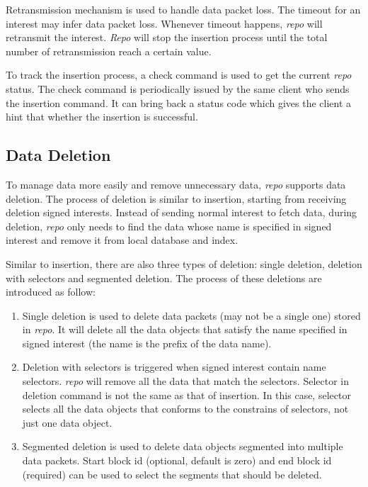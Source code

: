 \documentclass[conference]{IEEEtran}
\begin{document}
Retransmission mechanism is used to handle data packet loss. The timeout for an interest may infer data packet loss. Whenever timeout happens, \emph{repo} will retransmit the interest. \emph{Repo} will stop the insertion process until the total number of retransmission reach a certain value.

To track the insertion process, a check command is used to get the current \emph{repo} status. The check command is periodically issued by the same client who sends the insertion command. It can bring back a status code which gives the client a hint that whether the insertion is successful.

\subsection{Data Deletion}

To manage data more easily and remove unnecessary data, \emph{repo} supports data deletion. The process of deletion is similar to insertion, starting from receiving deletion signed interests. Instead of sending normal interest to fetch data, during deletion, \emph{repo} only needs to find the data whose name is specified in signed interest and remove it
from local database and index.

Similar to insertion, there are also three types of deletion: single deletion, deletion with selectors and segmented deletion. The process of these deletions are introduced as follow:

\begin{enumerate}
\item Single deletion is used to delete data packets (may not be a single one) stored in \emph{repo}. It will delete all the data objects that satisfy the name specified in signed interest (the name is the prefix of the data name).
\item Deletion with selectors is triggered when signed interest contain name selectors. \emph{repo} will remove all the data that match the selectors. Selector in deletion command is not the same as that of insertion. In this case, selector selects all the data objects that conforms to the constrains of selectors, not just one data object.
\item Segmented deletion is used to delete data objects segmented into multiple data packets. Start block id (optional, default is zero) and end block id (required) can be used to select the segments that should be deleted.
\end{enumerate}
\end{document}
